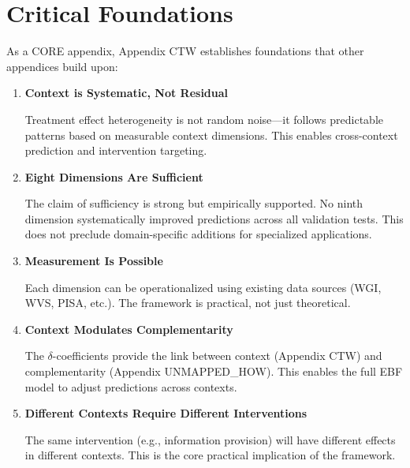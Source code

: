 \section{Critical Foundations}
\label{sec:V-foundations}

As a CORE appendix, Appendix CTW establishes foundations that other appendices build upon:

\begin{enumerate}
    \item \textbf{Context is Systematic, Not Residual}
    
    Treatment effect heterogeneity is not random noise---it follows predictable 
    patterns based on measurable context dimensions. This enables cross-context 
    prediction and intervention targeting.
    
    \item \textbf{Eight Dimensions Are Sufficient}
    
    The claim of sufficiency is strong but empirically supported. No ninth 
    dimension systematically improved predictions across all validation tests. 
    This does not preclude domain-specific additions for specialized applications.
    
    \item \textbf{Measurement Is Possible}
    
    Each dimension can be operationalized using existing data sources (WGI, WVS, 
    PISA, etc.). The framework is practical, not just theoretical.
    
    \item \textbf{Context Modulates Complementarity}
    
    The $\delta$-coefficients provide the link between context (Appendix CTW) and 
    complementarity (Appendix UNMAPPED_HOW). This enables the full EBF model to adjust 
    predictions across contexts.
    
    \item \textbf{Different Contexts Require Different Interventions}
    
    The same intervention (e.g., information provision) will have different effects 
    in different contexts. This is the core practical implication of the framework.
\end{enumerate}


